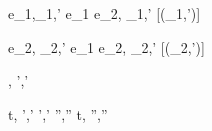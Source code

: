   {e_1,\hat\sigma \hat\normalise {}_1,\hat{\sigma}'}
  {e_1 \Xor e_2,\hat\sigma \xrightarrow[]{\Left} _1,\hat{\sigma}'}
  [\neg\Failing(_1,\hat{\sigma}')]

  {e_2,\hat\sigma \hat{\normalise} _2,\hat{\sigma}'}
  {e_1 \Xor e_2,\hat\sigma \xrightarrow[]{\Right} _2,\hat{\sigma}'}
  [\neg\Failing(_2,\hat{\sigma}')]




  {,\hat{\sigma}  ',\hat{\sigma}'}



  {t,\sigma {} ',\hat{\sigma}' \Quad
   ',\hat{\sigma}' \hat{\normalise} '',\hat{\sigma}''}
  {t,\sigma {} '',\hat{\sigma}''}
